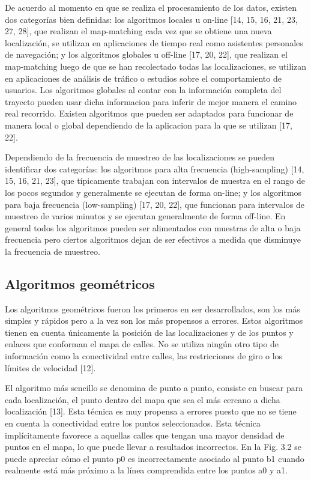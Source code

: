 De acuerdo al momento en que se realiza el procesamiento de los datos, existen dos categorías bien definidas: los algoritmos locales u on-line [14, 15, 16, 21, 23, 27, 28], que realizan el map-matching cada vez que se obtiene una nueva localización, se utilizan en aplicaciones de tiempo real como asistentes personales de navegación; y los algoritmos globales u off-line [17, 20, 22], que realizan el map-matching luego de que se han recolectado todas las localizaciones, se utilizan en aplicaciones de análisis de tráfico o estudios sobre el comportamiento de usuarios. Los algoritmos globales al contar con la información completa del trayecto pueden usar dicha informacion para inferir de mejor manera el camino real recorrido. Existen algoritmos que pueden ser adaptados para funcionar de manera local o global dependiendo de la aplicacion para la que se utilizan [17, 22].

Dependiendo de la frecuencia de muestreo de las localizaciones se pueden identificar dos categorías: los algoritmos para alta frecuencia (high-sampling) [14, 15, 16, 21, 23], que típicamente trabajan con intervalos de muestra en el rango de los pocos segundos y generalmente se ejecutan de forma on-line; y los algoritmos para baja frecuencia (low-sampling) [17, 20, 22],  que funcionan para intervalos de muestreo de varios minutos y se ejecutan generalmente de forma off-line. En general todos los algoritmos pueden ser alimentados con muestras de alta o baja frecuencia pero ciertos algoritmos dejan de ser efectivos a medida que disminuye la frecuencia de muestreo.

\subsection{Algoritmos geométricos}

Los algoritmos geométricos fueron los primeros en ser desarrollados, son los más simples y rápidos pero a la vez son los más propensos a errores. Estos algoritmos tienen en cuenta únicamente la posición de las localizaciones y de los puntos y enlaces que conforman el mapa de calles. No se utiliza ningún otro tipo de información como la conectividad entre calles, las restricciones de giro o los límites de velocidad [12].

El algoritmo más sencillo se denomina de punto a punto, consiste en buscar para cada localización, el punto dentro del mapa que sea el más cercano a dicha localización [13]. Esta técnica es muy propensa a errores puesto que no se tiene en cuenta la conectividad entre los puntos seleccionados. Esta técnica implícitamente favorece a aquellas calles que tengan una mayor densidad de puntos en el mapa, lo que puede llevar a resultados incorrectos. En la Fig. 3.2 se puede apreciar cómo el punto p0 es incorrectamente asociado al punto b1 cuando realmente está más próximo a la línea comprendida entre los puntos a0 y a1.

